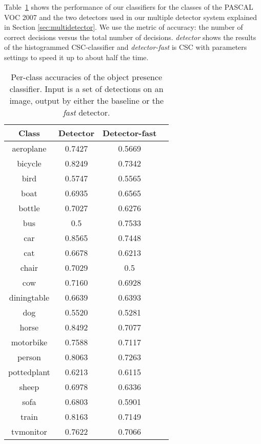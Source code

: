 Table~\ref{tab:scoreClassifier} shows the performance of our classifiers for the classes of the PASCAL VOC 2007 and the two detectors used in our multiple detector system explained in Section \ref{sec:multidetector}.
We use the metric of accuracy: the number of correct decisions versus the total number of decisions.
\textit{detector} shows the results of the histogrammed CSC-classifier and \textit{detector-fast} is CSC with parameters settings to speed it up to about half the time.

\begin{table}
  \begin{center}
    \begin{tabular}{ c| c c c}
      Class & Detector & Detector-fast\\
      \hline
      aeroplane & 0.7427 & 0.5669\\
      bicycle &  0.8249 & 0.7342\\
      bird & 0.5747 & 0.5565\\
      boat &  0.6935 & 0.6565\\
      bottle  & 0.7027 & 0.6276\\
      bus &  0.5 & 0.7533\\
      car &  0.8565 & 0.7448\\
      cat & 0.6678 & 0.6213\\
      chair  & 0.7029 & 0.5\\
      cow &  0.7160 & 0.6928\\
      diningtable  & 0.6639 & 0.6393\\
      dog  & 0.5520 & 0.5281\\
      horse  & 0.8492 & 0.7077\\
      motorbike  & 0.7588 & 0.7117\\
      person &  0.8063 & 0.7263\\
      pottedplant  & 0.6213 & 0.6115\\ 
      sheep &  0.6978 & 0.6336\\ 
      sofa &  0.6803 & 0.5901\\ 
      train  &  0.8163 & 0.7149\\ 
      tvmonitor & 0.7622 & 0.7066
    \end{tabular}
    \caption{Per-class accuracies of the object presence classifier. Input is a set of detections on an image, output by either the baseline or the \emph{fast} detector.}
    \label{tab:scoreClassifier}
  \end{center}
\end{table}



